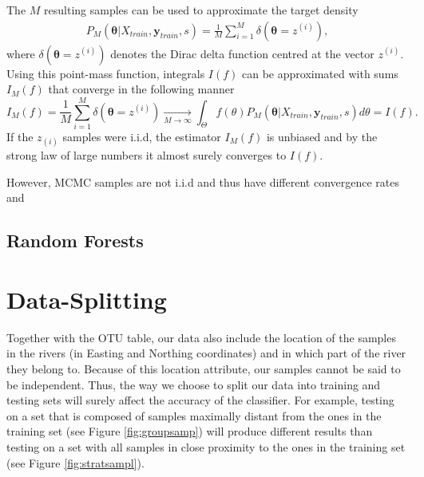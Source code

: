    The $M$ resulting samples can be used to approximate the target density 
   \begin{align}
   	P_M(\bm{\theta}|X_{train},\mathbf{y}_{train},s) = \frac{1}{M}\sum_{i = 1}^M \delta(\bm{\theta} = z^{(i)}),
   \end{align}
   where $\delta(\bm{\theta} = z^{(i)})$ denotes the Dirac delta function centred at the vector $z^{(i)}$. Using this point-mass function, integrals $I(f)$ can be approximated with sums $I_M(f)$ that converge in the following manner
   \begin{equation}
   	I_M(f) = \frac{1}{M}\sum_{i = 1}^M \delta(\bm{\theta} = z^{(i)})      \underset{M \rightarrow \infty}{{\rightarrow}} \int_{\Theta} f(\theta)P_M(\bm{\theta}|X_{train},\mathbf{y}_{train},s) d\theta = I(f).
   \end{equation}
   If the $z_{(i)}$ samples were i.i.d, the estimator $I_M(f)$ is unbiased and by the strong law of large numbers it almost surely converges to $I(f)$. 
   
   However, MCMC samples are not i.i.d and thus have different convergence rates and 
   
   
\subsection{Random Forests}
\section{Data-Splitting}

Together with the OTU table, our data also include the location of the samples in the rivers (in Easting and Northing coordinates) and in which part of the river they belong to. Because of this location attribute, our samples cannot be said to be independent. Thus, the way we choose to split our data into training and testing sets will surely affect the accuracy of the classifier. For example, testing on a set that is composed of samples maximally distant from the ones in the training set (see Figure \ref{fig:groupsamp}) will produce different results than testing on a set with all samples in close proximity to the ones in the training set (see Figure \ref{fig:stratsampl}).

